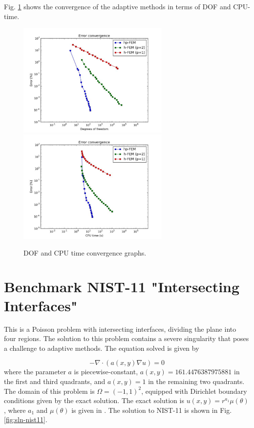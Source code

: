 \documentclass[12pt]{elsarticle}
\begin{document}
Fig. \ref{fig:nist-10-conv} shows the convergence of the adaptive methods in terms of DOF and CPU-time.

\begin{figure}[H]
\centering
\hspace{-50mm}
\includegraphics[width=7.5cm]{mafig63.pdf}\ \
\hspace{-10mm}
\includegraphics[width=7.5cm]{mafig64.pdf}
\hspace{-50mm}
\vspace{-2mm}
\caption{DOF and CPU time convergence graphs.}
\label{fig:nist-10-conv}
\end{figure}


\section{Benchmark NIST-11 "Intersecting Interfaces"}
\label{sec:bench-11}

This is a Poisson problem with intersecting interfaces,
dividing the plane into four regions.
The solution to this problem contains a severe
singularity that poses a challenge to adaptive methods.
The equation solved is given by

\begin{equation} \label{intersecting}
-\nabla \cdot (a(x,y) \nabla u) = 0
\end{equation}
where the parameter $a$ is piecewise-constant,
$a(x,y) = 161.4476387975881$ in the first and third quadrants,
and $a(x,y) = 1$ in the remaining two quadrants.
The domain of this problem is $\Omega = (-1, 1)^2$, equipped with
Dirichlet boundary conditions given by the exact solution.
The exact solution is
$u(x,y) = r^{a_1} \mu (\theta)$,
where $a_1$ and $\mu (\theta)$ is given in \cite{mitchell-1}.
The solution to NIST-11 is shown in Fig. \ref{fig:sln-nist11}.
\end{document}
